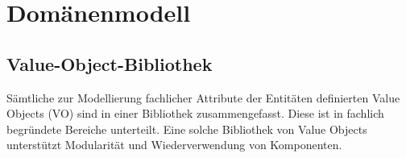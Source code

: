 


\section{Domänenmodell}
\subsection{Value-Object-Bibliothek}
Sämtliche zur Modellierung fachlicher Attribute der Entitäten definierten Value Objects (VO) sind in einer Bibliothek zusammengefasst. Diese ist in fachlich begründete Bereiche unterteilt. Eine solche Bibliothek von Value Objects unterstützt Modularität und Wiederverwendung von Komponenten. 

